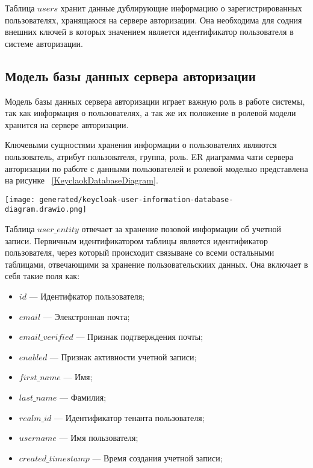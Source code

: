 Таблица $users$ хранит данные дублирующие информацию о зарегистрированных пользователях, хранящаюся на сервере авторизации. Она необходима для содния внешних ключей в которых значением является идентификатор пользователя в системе авторизации.

\subsection{Модель базы данных сервера авторизации}

Модель базы данных сервера авторизации играет важную роль в работе системы, так как информация о пользователях, а так же их положение в ролевой модели хранится на сервере авторизации.

Ключевыми сущностями хранения информации о пользователях являются пользователь, атрибут пользователя, группа, роль. ER диаграмма чати сервера авторизации по работе с данными пользователей и ролевой моделью представлена на рисунке ~\ref{KeyclaokDatabaseDiagram}.

\begin{figure*}[!t]
  \centering
  \texttt{[image: generated/keycloak-user-information-database-diagram.drawio.png]}
  \caption{Модель хранения данных пользователей на сервере авторизации}
  \label{KeyclaokDatabaseDiagram}
\end{figure*}

Таблица $user\_entity$ отвечает за хранение позовой информации об учетной записи. Первичным идентификатором таблицы является идентификатор пользователя, через который происходит связыване со всеми остальными таблицами, отвечающими за хранение пользовательскиих данных. Она включает в себя такие поля как:

\begin{itemize}
  \item[---]$id$ --- Идентифкатор пользователя;
  \item[---]$email$ --- Элекстронная почта;
  \item[---]$email\_verified$ --- Признак подтверждения почты;
  \item[---]$enabled$ --- Признак активности учетной записи;
  \item[---]$first\_name$ --- Имя;
  \item[---]$last\_name$ --- Фамилия;
  \item[---]$realm\_id$ --- Идентификатор тенанта пользователя;
  \item[---]$username$ --- Имя пользователя;
  \item[---]$created\_timestamp$ --- Время создания учетной записи;
\end{itemize}

